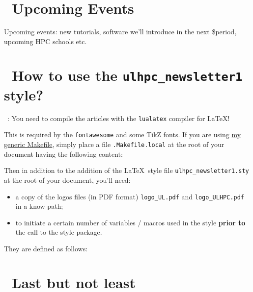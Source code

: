 \documentclass[a4paper]{article}
\begin{document}
\section{\faCalendar\ Upcoming Events}
Upcoming events: new tutorials, software we'll introduce in the next
\$period, upcoming HPC schools etc.

\newpage
\section{\faCogs\ How to use the \texttt{ulhpc\_newsletter1} style?}

\begin{tcolorbox}[colback=red!5!white]
\faWarningSign\ : You need to compile the articles with the \texttt{lualatex} compiler for \LaTeX!  
\end{tcolorbox}
This is required by the \texttt{fontawesome} and some TikZ fonts. 
If you are using \href{https://github.com/Falkor/Makefiles/blob/devel/latex/Makefile}{my generic Makefile}, 
simply place a file \texttt{.Makefile.local} at the root of your document having the following content:



Then in addition to the addition of the \LaTeX\ style file \texttt{ulhpc\_newsletter1.sty} at the root of your document, you'll need: 

\begin{itemize}
  \item a copy of the logos files (in PDF format) \texttt{logo\_UL.pdf} and \texttt{logo\_ULHPC.pdf} in a know path;
  \item to initiate a certain number of variables / macros used in the style \textbf{prior to} the call to the style package.
\end{itemize}

They are defined as follows: 






\section{\faBeer\ Last but not least}

\lipsum[2-8]
\end{document}

